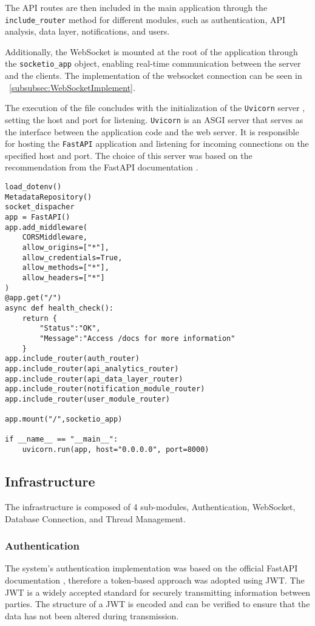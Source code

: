The \gls{API} routes are then included in the main application through the \texttt{include\_router} method for different modules, such as authentication, API analysis, data layer, notifications, and users.

Additionally, the WebSocket is mounted at the root of the application through the \texttt{socketio\_app} object, enabling real-time communication between the server and the clients. The implementation of the websocket connection can be seen in ~\ref{subsubsec:WebSocketImplement}.

The execution of the file concludes with the initialization of the \texttt{Uvicorn} server \cite{uvicornOfficialDocs}, setting the host and port for listening. \texttt{Uvicorn} is an \gls{ASGI} server that serves as the interface between the application code and the web server. It is responsible for hosting the \texttt{FastAPI} application and listening for incoming connections on the specified host and port. The choice of this server was based on the recommendation from the FastAPI documentation \cite{fastapiTutorial}.

\begin{Verbatim}[fontsize=\small, baselinestretch=0.8]
load_dotenv()
MetadataRepository()
socket_dispacher
app = FastAPI()
app.add_middleware(
    CORSMiddleware,
    allow_origins=["*"],
    allow_credentials=True,
    allow_methods=["*"],
    allow_headers=["*"]
)
@app.get("/")
async def health_check():
    return {
        "Status":"OK",
        "Message":"Access /docs for more information"    
    }
app.include_router(auth_router)
app.include_router(api_analytics_router)
app.include_router(api_data_layer_router)
app.include_router(notification_module_router)
app.include_router(user_module_router)

app.mount("/",socketio_app)

if __name__ == "__main__":
    uvicorn.run(app, host="0.0.0.0", port=8000)
\end{Verbatim}

\subsection{Infrastructure}\label{subsec:infra}

The infrastructure is composed of 4 sub-modules, Authentication, WebSocket, Database Connection, and Thread Management.

\subsubsection{Authentication}\label{subsubsec:auth}
The system's authentication implementation was based on the official FastAPI documentation \cite{fastapiSecurity}, therefore a token-based approach was adopted using \gls{JWT}. The \gls{JWT} is a widely accepted standard for securely transmitting information between parties. The structure of a \gls{JWT} is encoded and can be verified to ensure that the data has not been altered during transmission.

